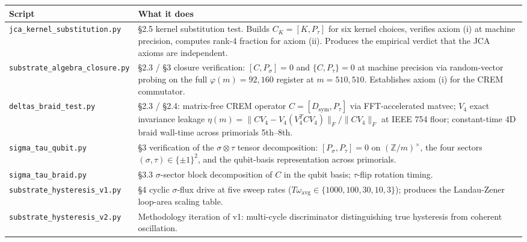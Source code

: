 \documentclass[
]{article}
\newcounter{none} %
\begin{document}
{\def\LTcaptype{none} %
\begin{longtable}[]{@{}
  >{\raggedright\arraybackslash}p{}
  >{\raggedright\arraybackslash}p{}@{}}
\toprule\noalign{}
\begin{minipage}[b]{\linewidth}\raggedright
Script
\end{minipage} & \begin{minipage}[b]{\linewidth}\raggedright
What it does
\end{minipage} \\
\midrule\noalign{}
\endhead
\bottomrule\noalign{}
\endlastfoot
\texttt{jca\_kernel\_substitution.py} & §2.5 kernel substitution test.
Builds \(C_K = [K, P_\tau]\) for six kernel choices, verifies axiom (i)
at machine precision, computes rank-4 fraction for axiom (ii). Produces
the empirical verdict that the JCA axioms are independent. \\
\texttt{substrate\_algebra\_closure.py} & §2.3 / §3 closure
verification: \([C, P_\sigma] = 0\) and \(\{C, P_\tau\} = 0\) at machine
precision via random-vector probing on the full
\(\varphi(m) = 92{,}160\) register at \(m = 510{,}510\). Establishes
axiom (i) for the CREM commutator. \\
\texttt{deltas\_braid\_test.py} & §2.3 / §2.4: matrix-free CREM operator
\(C = [D_\text{sym}, P_\tau]\) via FFT-accelerated matvec; \(V_4\) exact
invariance leakage
\(\eta(m) = \|CV_4 - V_4(V_4^T C V_4)\|_F / \|CV_4\|_F\) at IEEE 754
floor; constant-time 4D braid wall-time across primorials 5th--8th. \\
\texttt{sigma\_tau\_qubit.py} & §3 verification of the
\(\sigma\otimes\tau\) tensor decomposition: \([P_\sigma, P_\tau] = 0\)
on \((\mathbb{Z}/m)^\times\), the four sectors
\((\sigma, \tau) \in \{\pm 1\}^2\), and the qubit-basis representation
across primorials. \\
\texttt{sigma\_tau\_braid.py} & §3.3 \(\sigma\)-sector block
decomposition of \(C\) in the qubit basis; \(\tau\)-flip rotation
timing. \\
\texttt{substrate\_hysteresis\_v1.py} & §4 cyclic \(\sigma\)-flux drive
at five sweep rates
(\(T \omega_\text{avg} \in \{1000, 100, 30, 10, 3\}\)); produces the
Landau-Zener loop-area scaling table. \\
\texttt{substrate\_hysteresis\_v2.py} & Methodology iteration of v1:
multi-cycle discriminator distinguishing true hysteresis from coherent
oscillation. \\

\end{longtable}}
\end{document}
